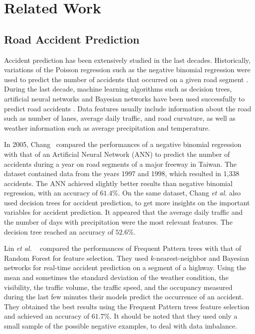 \documentclass[conference]{IEEEtran}
\begin{document}
\section{Related Work}
\label{sec:relatedwork}
\subsection{Road Accident Prediction}
Accident prediction has been extensively studied in the last decades.
Historically, variations of the Poisson regression such as the negative
binomial regression were used to predict the number of accidents that
occurred on a given road segment \cite{Milton1998}. During the last decade,
machine learning algorithms such as decision trees, artificial neural networks
and Bayesian networks have been used successfully to predict road accidents
\cite{Chang2005, Chang2005b, Lin2015, Theofilatos2017}.
Data features usually include information about the road such as number of
lanes, average daily traffic, and road curvature, as well as weather
information such as average precipitation and temperature. 

In 2005,
Chang~\cite{Chang2005} compared the performances of a negative binomial
regression with that of an Artificial Neural Network (ANN) to predict the number
of accidents during a year on road segments of a major freeway in
Taiwan. The dataset contained data from the years 1997 and 1998, which
resulted in 1,338 accidents. The ANN achieved slightly better results than negative 
binomial regression, with
an accuracy of $61.4\%$. On the same dataset, Chang \textit{et al.} \cite{Chang2005b} also used decision trees for accident prediction,
 to get more insights on the important variables for accident
prediction. It appeared that the average daily traffic and the number of
days with precipitation were the most relevant features. The decision tree
reached an accuracy of $52.6\%$. 

Lin \textit{et al.} ~\cite{Lin2015} compared the performances of Frequent Pattern trees\cite{Han2004} with
that of Random Forest for feature selection. They used $k$-nearest-neighbor
and Bayesian networks for real-time accident prediction on a segment of
a highway. Using the mean and sometimes the standard deviation of the weather condition, the visibility, the traffic volume, the traffic speed, and the occupancy measured during the last few minutes their models predict the occurrence of an accident. They obtained
the best results using the Frequent Pattern trees feature selection and achieved
an accuracy of $61.7\%$. It should be noted that they used only a small sample of the
possible negative examples, to deal with data imbalance. 
\end{document}
